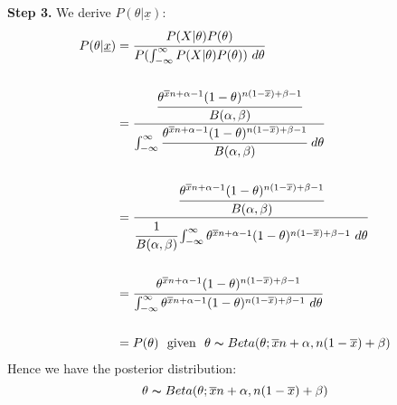 \documentclass{report}
\begin{document}
                \textbf{Step 3.} We derive $P(\theta|\underline{x})$:
                \[\begin{split}
                    P(\theta|\underline{x}) &= \cfrac{P(X|\theta)P(\theta)}{P(\int_{-\infty}^\infty P(X|\theta)P(\theta)) \ d\theta} \\
                    \\
                    &= \cfrac{\cfrac{\theta^{\overline{x}n + \alpha - 1}(1 - \theta)^{n(1 - \overline{x}) + \beta - 1}}{B(\alpha,\beta)}}{\int_{-\infty}^\infty \cfrac{\theta^{\overline{x}n + \alpha - 1}(1 - \theta)^{n(1 - \overline{x}) + \beta - 1}}{B(\alpha,\beta)} \ d\theta} \\
                    \\
                    &= \cfrac{\cfrac{\theta^{\overline{x}n + \alpha - 1}(1 - \theta)^{n(1 - \overline{x}) + \beta - 1}}{B(\alpha,\beta)}}{\cfrac{1}{B(\alpha,\beta)}\int_{-\infty}^\infty \theta^{\overline{x}n + \alpha - 1}(1 - \theta)^{n(1 - \overline{x}) + \beta - 1} \ d\theta} \\
                    \\
                    &= \cfrac{\theta^{\overline{x}n + \alpha - 1}(1 - \theta)^{n(1 - \overline{x}) + \beta - 1}}{\int_{-\infty}^\infty \theta^{\overline{x}n + \alpha - 1}(1 - \theta)^{n(1 - \overline{x}) + \beta - 1} \ d\theta} \\
                    \\
                    &= P(\theta) \ \text{ given } \ \theta \thicksim Beta(\theta; \overline{x}n + \alpha, n(1 - \overline{x}) + \beta)
                \end{split}\]
                Hence we have the posterior distribution:
                \[\theta \thicksim Beta(\theta; \overline{x}n + \alpha, n(1 - \overline{x}) + \beta)\]
\end{document}
